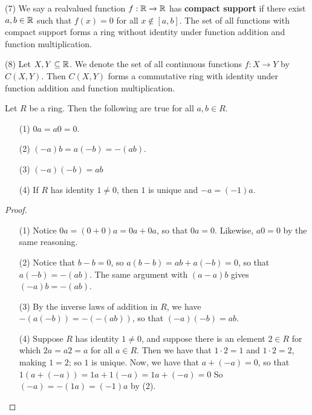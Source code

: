 \begin{example}
    \item[(7)] We say a realvalued function $f:\mathbb{R} \xrightarrow{} \mathbb{R}$ has
        \textbf{compact support} if there exist $a,b \in \mathbb{R}$ such that $f(x)=0$
        for all $x \notin [a,b]$. The set of all functions with compact support
        forms a ring without identity under function addition and function
        multiplication.

    \item[(8)] Let $X,Y \subseteq \mathbb{R}$. We denote the set of all continuous
        functions  $f:X \xrightarrow{} Y$ by $C(X,Y)$. Then $C(X,Y)$ forms a
        commutative ring with identity under function addition and function
        multiplication.
\end{example}

\begin{lemma}\label{1.1.1}
    Let $R$ be a ring. Then the following are true for all  $a,b \in R$.
    \begin{enumerate}
        \item[(1)] $0a=a0=0$.

        \item[(2)] $(-a)b=a(-b)=-(ab)$.

        \item[(3)] $(-a)(-b)=ab$

        \item[(4)] If $R$ has identity  $1 \neq 0$, then $1$ is unique and
            $-a=(-1)a$.
    \end{enumerate}
\end{lemma}
\begin{proof}
    \begin{enumerate}
        \item[(1)] Notice $0a=(0+0)a=0a+0a$, so that $0a=0$. Likewise, $a0=0$ by
            the same reasoning.

        \item[(2)] Notice that $b-b=0$, so $a(b-b)=ab+a(-b)=0$, so that
            $a(-b)=-(ab)$. The same argument with $(a-a)b$ gives $(-a)b=-(ab)$.

        \item[(3)] By the inverse laws of addition in $R$, we have
            $-(a(-b))=-(-(ab))$, so that $(-a)(-b)=ab$.

    \item[(4)] Suppose $R$ has identity $1 \neq 0$, and suppose there is an
        element $2 \in R$ for which  $2a=a2=a$ for all $a \in R$. Then we have
        that $1 \cdot 2=1$ and  $1 \cdot 2=2$, making  $1=2$; so  $1$ is unique.
        Now, we have that $a+(-a)=0$, so that $1(a+(-a))=1a+1(-a)=1a+(-a)=0$ So
        $(-a)=-(1a)=(-1)a$ by (2).
    \end{enumerate}
\end{proof}

